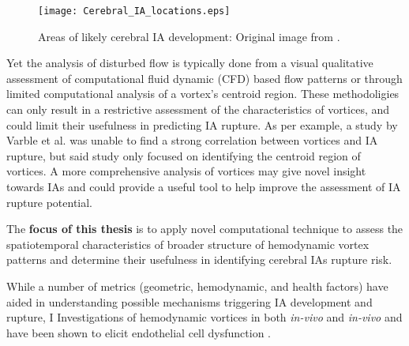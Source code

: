 \begin{figure}[h]
 \begin{center}
  \texttt{[image: Cerebral\_IA\_locations.eps]}
\caption{Areas of likely cerebral IA development: Original image from \cite{Cerebral_IA_Location}.}
\end{center}
\label{IA_Areas}
\end{figure}
 
Yet the analysis of disturbed flow is typically done from a visual qualitative assessment of computational fluid dynamic (CFD) based flow patterns or through limited computational analysis of a vortex's centroid region. These methodoligies can only result in a restrictive assessment of the characteristics of vortices, and could limit their usefulness in predicting IA rupture. As per example, a study by Varble et al\cite{varble2017identification}. was unable to find a strong correlation between vortices and IA rupture, but said study only focused on identifying the centroid region of vortices. A more comprehensive analysis of vortices may give novel insight towards IAs and could provide a useful tool to help improve the assessment of IA rupture potential. 

The \textbf{focus of this thesis} is to apply novel computational technique to assess the spatiotemporal characteristics of broader structure of hemodynamic vortex patterns and determine their usefulness in identifying cerebral IAs rupture risk. 
 

While a number of metrics (geometric, hemodynamic, and health factors) have aided in understanding possible mechanisms triggering IA development and rupture,  I Investigations of hemodynamic vortices in both \textit{in-vivo} and \textit{in-vivo} and have been shown to elicit endothelial cell dysfunction \cite{balaguru2016disturbed,mannino2015yourself,nowicki2014novel}.


